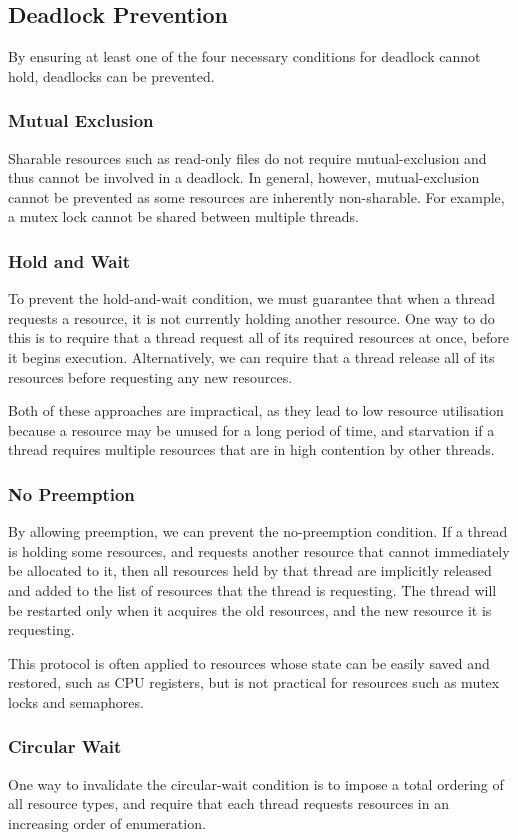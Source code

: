 \documentclass{article}
\begin{document}
\subsection{Deadlock Prevention}
By ensuring at least one of the four necessary conditions for deadlock
cannot hold, deadlocks can be prevented.
\subsubsection{Mutual Exclusion}
Sharable resources such as read-only files do not require
mutual-exclusion and thus cannot be involved in a deadlock. In general,
however, mutual-exclusion cannot be prevented as some resources are
inherently non-sharable. For example, a mutex lock cannot be shared
between multiple threads.
\subsubsection{Hold and Wait}
To prevent the hold-and-wait condition, we must guarantee that when a
thread requests a resource, it is not currently holding another
resource. One way to do this is to require that a thread request all of
its required resources at once, before it begins execution.
Alternatively, we can require that a thread release all of its
resources before requesting any new resources.

Both of these approaches are impractical, as they lead to low resource
utilisation because a resource may be unused for a long period of time,
and starvation if a thread requires multiple resources that are in high
contention by other threads.
\subsubsection{No Preemption}
By allowing preemption, we can prevent the no-preemption condition. If
a thread is holding some resources, and requests another resource that
cannot immediately be allocated to it, then all resources held by that
thread are implicitly released and added to the list of resources that
the thread is requesting. The thread will be restarted only when it
acquires the old resources, and the new resource it is requesting.

This protocol is often applied to resources whose state can be easily
saved and restored, such as CPU registers, but is not practical for
resources such as mutex locks and semaphores.
\subsubsection{Circular Wait}
One way to invalidate the circular-wait condition is to impose a total
ordering of all resource types, and require that each thread requests
resources in an increasing order of enumeration.
\end{document}
